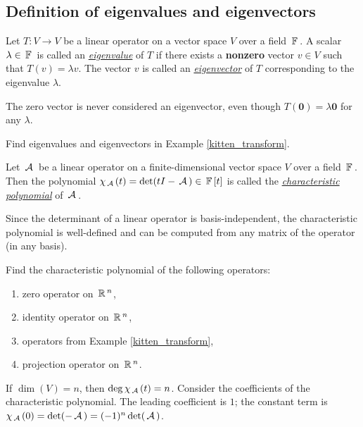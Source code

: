 \subsection{Definition of eigenvalues and eigenvectors}

\begin{definition}
Let $T\colon V \to V$ be a linear operator on a vector space $V$ over a field $\,\mathbb{F}\,$. A scalar $\lambda \in \,\mathbb{F}\,$ is called an \underline{\it eigenvalue} of $T$ if there exists a {\bf nonzero} vector $v \in V$ such that $T(v) = \lambda v$.
The vector $v$ is called an \underline{\it eigenvector} of $T$ corresponding to the eigenvalue $\lambda$.
\end{definition}

\begin{remark}
The zero vector is never considered an eigenvector, even though $T(\mathbf{0}) = \lambda \mathbf{0}$ for any $\lambda$.
\end{remark}

\begin{exercise}
Find eigenvalues and eigenvectors in Example \ref{kitten_transform}.
\end{exercise}

\begin{definition}
Let $\,\mathcal{A}\,$ be a linear operator on a finite-dimensional vector space $V$ over a field $\,\mathbb{F}\,$. Then the polynomial $\chi_{\,\mathcal{A}\,}(t) = \det(t I - \,\mathcal{A}\,)\in \,\mathbb{F}\,[t]$ is called the \underline{\it characteristic polynomial} of $\,\mathcal{A}\,$.
\end{definition}

Since the determinant of a linear operator is basis-independent, the characteristic polynomial is well-defined and can be computed from any matrix of the operator (in any basis).

\begin{example}
Find the characteristic polynomial of the following operators:
\begin{enumerate}
    \item zero operator on $\,\mathbb{R}\,^n$,
    \item identity operator on $\,\mathbb{R}\,^n$,
    \item operators from Example \ref{kitten_transform},
    \item projection operator on $\,\mathbb{R}\,^n$.
\end{enumerate}
\end{example}

If $\dim(V) = n$, then $\deg\chi_{\,\mathcal{A}\,}(t) = n$. Consider the coefficients of the characteristic polynomial. The leading coefficient is $1$; the constant term is $\chi_{\,\mathcal{A}\,}(0) = \det(-\,\mathcal{A}\,) = (-1)^n\det(\,\mathcal{A}\,)$.

